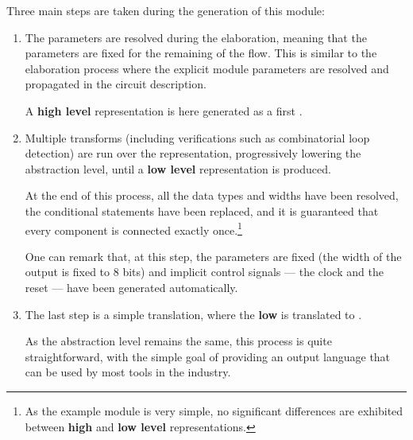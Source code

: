             Three main steps are taken during the generation of this module:
            \begin{enumerate}
                \item The \chisel{} parameters are resolved during the elaboration, meaning that the parameters are fixed for the remaining of the flow.
                    This is similar to the \verilog{} elaboration process where the explicit module parameters are resolved and propagated in the circuit description.

                    A {\bf high level} \firrtl{} representation is here generated as a first .
                \item Multiple transforms (including verifications such as combinatorial loop detection) are run over the \firrtl{} representation, progressively lowering the abstraction level, until a {\bf low level} representation is produced.

                    At the end of this process, all the data types and widths have been resolved, the conditional statements have been replaced, and it is guaranteed that every component is connected exactly once.\footnote{As the example module is very simple, no significant differences are exhibited between {\bf high} and {\bf low level} \firrtl{} representations.}

                    One can remark that, at this step, the parameters are fixed (\eg the width of the output is fixed to 8 bits) and implicit control signals --- \ie the clock and the reset --- have been generated automatically.
                \item The last step is a simple translation, where the {\bf low} \firrtl{} is translated to \verilog{}.

                    As the abstraction level remains the same, this process is quite straightforward, with the simple goal of providing an output language that can be used by most tools in the industry.
            \end{enumerate}

